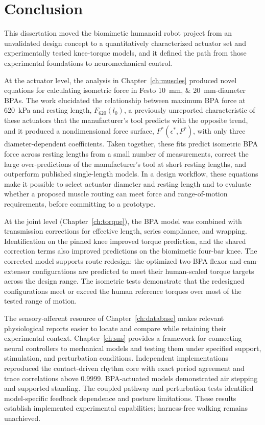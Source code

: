 \chapter{Conclusion}\label{ch:conclusion}
\graphicspath{{../Figures/80-conclusion/}{figs/80-conclusion/}}

This dissertation moved the biomimetic humanoid robot project from an unvalidated design concept to a quantitatively characterized actuator set and experimentally tested knee-torque models, and it defined the path from those experimental foundations to neuromechanical control.

At the actuator level, the analysis in Chapter~\ref{ch:muscles} produced novel equations for calculating isometric force in Festo \qtylist{10;20}{\mm}-diameter BPAs. The work elucidated the relationship between maximum BPA force at \qty{620}{\kPa} and resting length, $F_{620}(l_0)$, a previously unreported characteristic of these actuators that the manufacturer's tool predicts with the opposite trend, and it produced a nondimensional force surface, $F^*(\epsilon^*,P^*)$, with only three diameter-dependent coefficients. Taken together, these fits predict isometric BPA force across resting lengths from a small number of measurements, correct the large over-predictions of the manufacturer's tool at short resting lengths, and outperform published single-length models. In a design workflow, these equations make it possible to select actuator diameter and resting length and to evaluate whether a proposed muscle routing can meet force and range-of-motion requirements, before committing to a prototype.

At the joint level (Chapter~\ref{ch:torque}), the BPA model was combined with transmission corrections for effective length, series compliance, and wrapping. Identification on the pinned knee improved torque prediction, and the shared correction terms also improved predictions on the biomimetic four-bar knee. The corrected model supports route redesign: the optimized two-BPA flexor and cam-extensor configurations are predicted to meet their human-scaled torque targets across the design range. The isometric tests demonstrate that the redesigned configurations meet or exceed the human reference torques over most of the tested range of motion.

The sensory-afferent resource of Chapter~\ref{ch:database} makes relevant physiological reports easier to locate and compare while retaining their experimental context. Chapter~\ref{ch:sns} provides a framework for connecting neural controllers to mechanical models and testing them under specified support, stimulation, and perturbation conditions. Independent implementations reproduced the contact-driven rhythm core with exact period agreement and trace correlations above 0.9999. BPA-actuated models demonstrated air stepping and supported standing. The coupled pathway and perturbation tests identified model-specific feedback dependence and posture limitations. These results establish implemented experimental capabilities; harness-free walking remains unachieved.

